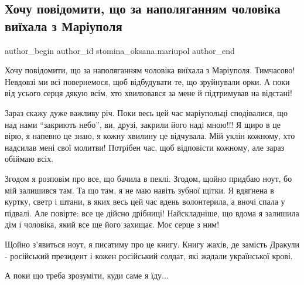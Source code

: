  
 
 
 
 

\subsection{Хочу повідомити, що за наполяганням чоловіка виїхала з Маріуполя}
\label{sec:18_03_2022.fb.stomina_oksana.mariupol.1.khochu_pov_domiti__s}

\ifcmt
 author_begin
   author_id stomina_oksana.mariupol
 author_end
\fi

Хочу повідомити, що за наполяганням чоловіка виїхала з Маріуполя. Тимчасово!
Невдовзі ми всі повернемося, щоб відбудувати те, що зруйнували орки. А поки від
усього серця дякую всім, хто хвилювався за мене й підтримував на відстані!

Зараз скажу дуже важливу річ. Поки весь цей час маріупольці сподівалися, що над
нами \enquote{закриють небо}, ви, друзі, закрили його наді мною!!! Я щиро в це вірю, я
напевно це знаю, я кожну хвилину це відчувала. Мій уклін кожному, хто надсилав
мені свої молитви! Потрібен час, щоб відповісти кожному, але зараз обіймаю
всіх.

Згодом я розповім про все, що бачила в пеклі. Згодом, щойно придбаю ноут, бо
мій залишився там. Та що там, я не маю навіть зубної щітки. Я вдягнена в
куртку, светр і штани, в яких весь цей час вдень волонтерила, а вночі спала у
підвалі. Але повірте: все це дійсно дрібниці! Найскладніше, що вдома я залишила
дім і чоловіка, який все ще його захищає. Моє серце з ним!

Щойно з'явиться ноут, я писатиму про це книгу. Книгу жахів, де замість Дракули
- російський президент і кожен російський солдат, які жадали української крові. 

А поки що треба зрозуміти, куди саме я їду...

